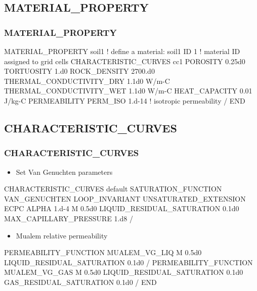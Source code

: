 \documentclass{beamer}
\newcommand\bluecomment[1]{{{\color{blue} #1}}}
\newcommand\greencomment[1]{{{\color{green} #1}}}
\begin{document}
\subsection{MATERIAL\_PROPERTY}

\begin{frame}\frametitle{MATERIAL\_PROPERTY}

\begin{semiverbatim}
MATERIAL_PROPERTY soil1  \bluecomment{! define a material:} \greencomment{soil1}
  ID 1             \bluecomment{! material ID assigned to grid cells}
  CHARACTERISTIC\_CURVES cc1
  POROSITY 0.25d0
  TORTUOSITY 1.d0
  ROCK_DENSITY 2700.d0
  THERMAL_CONDUCTIVITY_DRY 1.1d0 W/m-C
  THERMAL_CONDUCTIVITY_WET 1.1d0 W/m-C
  HEAT_CAPACITY 0.01 J/kg-C
  PERMEABILITY     
    PERM_ISO 1.d-14  \bluecomment{! isotropic permeability}
  /
END
\end{semiverbatim}

\end{frame}

\subsection{CHARACTERISTIC\_CURVES}

\begin{frame}\frametitle{CHARACTERISTIC\_CURVES}

\begin{itemize}
\item Set Van Genuchten parameters
\end{itemize}

\begin{semiverbatim}
CHARACTERISTIC_CURVES default
  SATURATION_FUNCTION VAN_GENUCHTEN
    LOOP_INVARIANT
    UNSATURATED_EXTENSION ECPC
    ALPHA  1.d-4
    M 0.5d0
    LIQUID_RESIDUAL_SATURATION 0.1d0
    MAX_CAPILLARY_PRESSURE 1.d8
  /
\end{semiverbatim}

\newpage
\begin{itemize}
\item Mualem relative permeability
\end{itemize}

\begin{semiverbatim}
  PERMEABILITY_FUNCTION MUALEM_VG_LIQ
    M 0.5d0
    LIQUID_RESIDUAL_SATURATION 0.1d0
  /
  PERMEABILITY_FUNCTION MUALEM_VG_GAS
    M 0.5d0
    LIQUID_RESIDUAL_SATURATION 0.1d0
    GAS_RESIDUAL_SATURATION 0.1d0
  /
END
\end{semiverbatim}

\end{frame}
\end{document}
